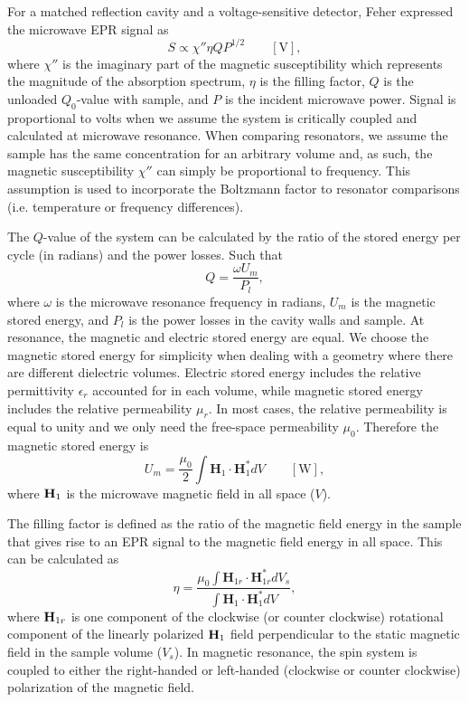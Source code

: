 For a matched reflection cavity and a voltage-sensitive detector, Feher expressed the microwave EPR signal as
\begin{equation}
    S \propto \chi'' \eta Q P^{1/2} \qquad [\text{V}],\label{ch2-fehereq}
\end{equation}
where $\chi''$ is the imaginary part of the magnetic susceptibility which represents the magnitude of the absorption spectrum, $\eta$ is the filling factor, $Q$ is the unloaded $Q_0$-value with sample, and $P$ is the incident microwave power.  \cite{FeherSignal} Signal is proportional to volts when we assume the system is critically coupled and calculated at microwave resonance. When comparing resonators, we assume the sample has the same concentration for an arbitrary volume and, as such, the magnetic susceptibility $\chi''$ can simply be proportional to frequency. This assumption is used to incorporate the Boltzmann factor to resonator comparisons (i.e. temperature or frequency differences).

The $Q$-value of the system can be calculated by the ratio of the stored energy per cycle (in radians) and the power losses. Such that
\begin{equation}
    Q = \frac{\omega U_m}{P_l},
\end{equation}
where $\omega$ is the microwave resonance frequency in radians, $U_m$ is the magnetic stored energy, and $P_l$ is the power losses in the cavity walls and sample. At resonance, the magnetic and electric stored energy are equal. \cite{ramo1984fields} We choose the magnetic stored energy for simplicity when dealing with a geometry where there are different dielectric volumes. Electric stored energy includes the relative permittivity $\epsilon_r$ accounted for in each volume, while magnetic stored energy includes the relative permeability $\mu_r$. In most cases, the relative permeability is equal to unity and we only need the free-space permeability $\mu_0$. Therefore the magnetic stored energy is
\begin{equation}
    U_m = \frac{\mu_0}{2} \int \mathbf{H}_1\cdot\mathbf{H}_1^* dV \qquad [\text{W}],
\end{equation}
where ${\textbf H}_1$ is the microwave magnetic field in all space ($V$).

The filling factor is defined as the ratio of the magnetic field energy in the sample that gives rise to an EPR signal to the magnetic field energy in all space. This can be calculated as
\begin{equation}
 \eta = \frac{\mu_0 \int {\mathbf H}_{1r} \cdot {\mathbf H}_{1r}^* dV_s}{\int {\mathbf H}_1 \cdot {\mathbf H}_1^* dV}, \label{eq-2:filling}
\end{equation}
where ${\textbf H}_{1r}$ is one component of the clockwise (or counter clockwise) rotational component of the linearly polarized ${\textbf H}_1$ field perpendicular to the static magnetic field in the sample volume ($V_s$). \cite{jackson1975classical} In magnetic resonance, the spin system is coupled to either the right-handed or left-handed (clockwise or counter clockwise) polarization of the magnetic field. 

